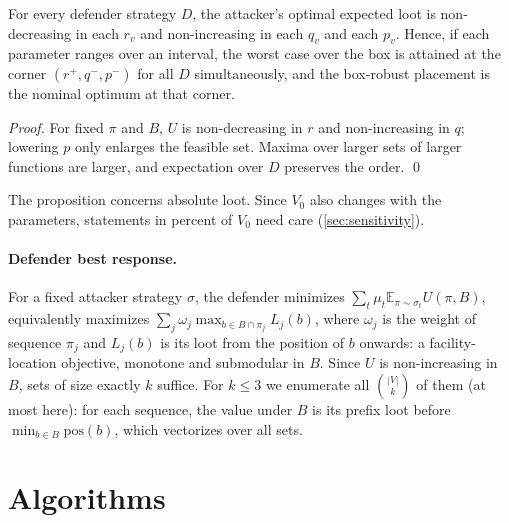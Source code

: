 \documentclass[runningheads]{llncs}
\newcommand{\Exp}{\mathbb{E}}
\begin{document}
\begin{proposition}\label{prop:robust}
For every defender strategy $D$, the attacker's optimal expected loot is non-decreasing in each $r_v$ and non-increasing in each $q_v$ and each $p_v$. Hence, if each parameter ranges over an interval, the worst case over the box is attained at the corner $(r^+,q^-,p^-)$ for all $D$ simultaneously, and the box-robust placement is the nominal optimum at that corner.
\end{proposition}
\begin{proof}
For fixed $\pi$ and $B$, $U$ is non-decreasing in $r$ and non-increasing in $q$; lowering $p$ only enlarges the feasible set. Maxima over larger sets of larger functions are larger, and expectation over $D$ preserves the order. \qed
\end{proof}

The proposition concerns absolute loot. Since $V_0$ also changes with the parameters, statements in percent of $V_0$ need care (\cref{sec:sensitivity}).

\paragraph{Defender best response.}
For a fixed attacker strategy $\sigma$, the defender minimizes $\sum_t\mu_t\Exp_{\pi\sim\sigma_t}U(\pi,B)$, equivalently maximizes $\sum_j \omega_j \max_{b\in B\cap\pi_j}L_j(b)$, where $\omega_j$ is the weight of sequence $\pi_j$ and $L_j(b)$ is its loot from the position of $b$ onwards: a facility-location objective, monotone and submodular in $B$. Since $U$ is non-increasing in $B$, sets of size exactly $k$ suffice. For $k\le3$ we enumerate all $\binom{|V|}{k}$ of them (at most \EnumSetsMax{} here): for each sequence, the value under $B$ is its prefix loot before $\min_{b\in B}\mathrm{pos}(b)$, which vectorizes over all sets.

\section{Algorithms}\label{sec:algorithms}
\end{document}
